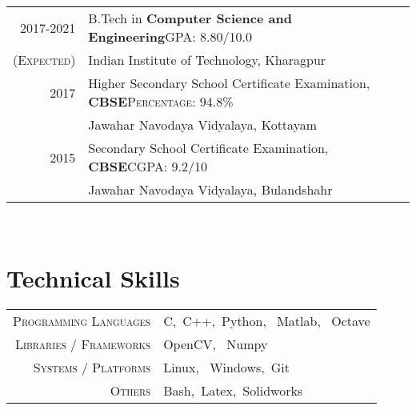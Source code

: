 \documentclass[a4paper,10pt]{extarticle} %
\begin{document}
  \begin{tabular}{r|p{17.5cm}}	
  2017-2021 & B.Tech in \textbf{Computer Science and Engineering}\hfill\textsc{GPA: } 8.80/10.0\\
  \textsc{(Expected)}& Indian Institute of Technology, Kharagpur \hfill\\
  2017 & Higher Secondary School Certificate Examination, \textbf{CBSE}\hfill\textsc{Percentage: } 94.8\% \\
  & Jawahar Navodaya Vidyalaya, Kottayam \hfill\\
  2015 & Secondary School Certificate Examination, \textbf{CBSE}\hfill\textsc{CGPA: } 9.2/10 \\
  & Jawahar Navodaya Vidyalaya, Bulandshahr \hfill\\
  \end{tabular}
  
  \hfill\\
  \section{\textcolor{primary}{Technical Skills}}
  
  \begin{tabular}{r|p{15cm}}
  \textsc{Programming Languages} & C,\ C++,\ Python, \ Matlab, \ Octave \\
  \textsc{Libraries / Frameworks} & OpenCV, \ Numpy \\
  \textsc{Systems / Platforms} & Linux, \ Windows,\ Git \\
  \textsc{Others} & Bash,\ Latex,\ Solidworks \\
  \end{tabular}
  
  \hfill\\
\end{document}

